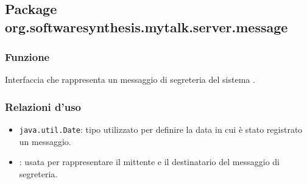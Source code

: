 \subsection{Package org.softwaresynthesis.mytalk.server.message}\label{sec:message}


\subsubsection*{Funzione}
Interfaccia che rappresenta un messaggio di segreteria del sistema \caName.

\subsubsection*{Relazioni d'uso}
\begin{itemize}
	\item \texttt{java.util.Date}: tipo utilizzato per definire la data in cui è stato registrato un messaggio.
	\item {}: usata per rappresentare il mittente e il destinatario del messaggio di segreteria.
\end{itemize}

